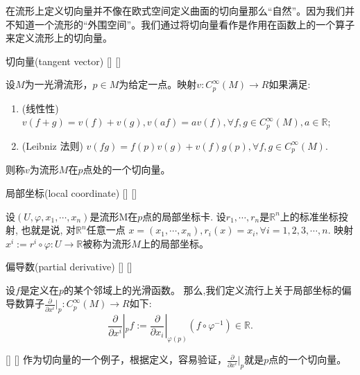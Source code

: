 \documentclass[UTF8]{ctexart}
\begin{document}
    \vspace{10pt}
    
    在流形上定义切向量并不像在欧式空间定义曲面的切向量那么“自然”。因为我们并不知道一个流形的“外围空间”。我们通过将切向量看作是作用在函数上的一个算子来定义流形上的切向量。
    \begin{dfn}
        []
        {切向量(tangent vector)}
        []
        []

        设$M$为一光滑流形，$p \in M$为给定一点。映射$ v : C_p^{\infty} (M) \rightarrow R $如果满足:
        \begin{enumerate}
            \item (线性性) $v (f + g) =v( f ) + v( g ), v(a f) = av( f ), \forall f,g \in C_p^{\infty} (M), a \in \mathbb{R}$;
            \item (Leibniz 法则) $ v(f g) = f(p)v(g)+v(f)g(p), \forall f,g \in C_p^{\infty} (M)$.
        \end{enumerate}
        则称$v$为流形$M$在$p$点处的一个切向量。
    \end{dfn}

    \begin{dfn}
        []
        {局部坐标(local coordinate)}
        []
        []

        设$(U, \varphi , x_1, \cdots , x_n)$是流形M在$p$点的局部坐标卡. 设$r_1, \cdots , r_n $是$\mathbb{R}^n$上的标准坐标投射, 也就是说, 对$\mathbb{R}^n$任意一点 $x = (x_1 , \cdots , x_n) , r_i(x) = x_i, \forall i= 1,2,3, \cdots , n$.
        映射$x^i := r^i \circ \varphi : U \rightarrow \mathbb{R}$被称为流形$M$上的局部坐标。
    \end{dfn}

    \begin{dfn}
        []
        {偏导数(partial derivative)}
        []
        []

        设$f$是定义在$p$的某个邻域上的光滑函数。 
        那么,我们定义流行上关于局部坐标的偏导数算子$\frac{\partial}{\partial x^i} |_p : C_p^{\infty} (M) \rightarrow R$如下:
            \[
            \frac{\partial}{\partial x^i} |_p f := \frac{\partial}{\partial x_i}|_{\varphi(p)} (f \circ \varphi^{-1} ) \in \mathbb{R}.
            \]
    \end{dfn}

    \begin{rmk}
        []
        {}
        []
        []
        作为切向量的一个例子，根据定义，容易验证，$\frac{\partial}{\partial x^i} |_p$就是$p$点的一个切向量。
    \end{rmk}
\end{document}
